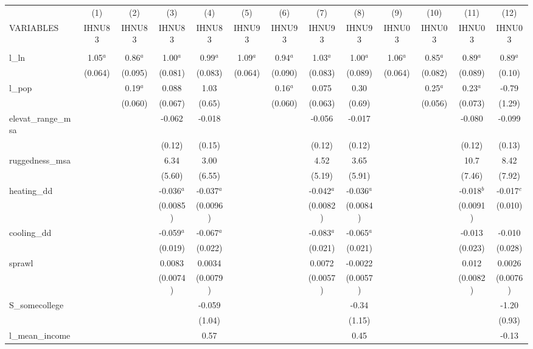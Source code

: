 \documentclass[]{article}
\begin{document}
\begin{tabular}{lcccccccccccc} \hline
 & (1) & (2) & (3) & (4) & (5) & (6) & (7) & (8) & (9) & (10) & (11) & (12) \\
VARIABLES & IHNU83 & IHNU83 & IHNU83 & IHNU83 & IHNU93 & IHNU93 & IHNU93 & IHNU93 & IHNU03 & IHNU03 & IHNU03 & IHNU03 \\ \hline
 &  &  &  &  &  &  &  &  &  &  &  &  \\
l\_ln & 1.05$^a$ & 0.86$^a$ & 1.00$^a$ & 0.99$^a$ & 1.09$^a$ & 0.94$^a$ & 1.03$^a$ & 1.00$^a$ & 1.06$^a$ & 0.85$^a$ & 0.89$^a$ & 0.89$^a$ \\
 & (0.064) & (0.095) & (0.081) & (0.083) & (0.064) & (0.090) & (0.083) & (0.089) & (0.064) & (0.082) & (0.089) & (0.10) \\
l\_pop &  & 0.19$^a$ & 0.088 & 1.03 &  & 0.16$^a$ & 0.075 & 0.30 &  & 0.25$^a$ & 0.23$^a$ & -0.79 \\
 &  & (0.060) & (0.067) & (0.65) &  & (0.060) & (0.063) & (0.69) &  & (0.056) & (0.073) & (1.29) \\
elevat\_range\_msa &  &  & -0.062 & -0.018 &  &  & -0.056 & -0.017 &  &  & -0.080 & -0.099 \\
 &  &  & (0.12) & (0.15) &  &  & (0.12) & (0.12) &  &  & (0.12) & (0.13) \\
ruggedness\_msa &  &  & 6.34 & 3.00 &  &  & 4.52 & 3.65 &  &  & 10.7 & 8.42 \\
 &  &  & (5.60) & (6.55) &  &  & (5.19) & (5.91) &  &  & (7.46) & (7.92) \\
heating\_dd &  &  & -0.036$^a$ & -0.037$^a$ &  &  & -0.042$^a$ & -0.036$^a$ &  &  & -0.018$^b$ & -0.017$^c$ \\
 &  &  & (0.0085) & (0.0096) &  &  & (0.0082) & (0.0084) &  &  & (0.0091) & (0.010) \\
cooling\_dd &  &  & -0.059$^a$ & -0.067$^a$ &  &  & -0.083$^a$ & -0.065$^a$ &  &  & -0.013 & -0.010 \\
 &  &  & (0.019) & (0.022) &  &  & (0.021) & (0.021) &  &  & (0.023) & (0.028) \\
sprawl &  &  & 0.0083 & 0.0034 &  &  & 0.0072 & -0.0022 &  &  & 0.012 & 0.0026 \\
 &  &  & (0.0074) & (0.0079) &  &  & (0.0057) & (0.0057) &  &  & (0.0082) & (0.0076) \\
S\_somecollege &  &  &  & -0.059 &  &  &  & -0.34 &  &  &  & -1.20 \\
 &  &  &  & (1.04) &  &  &  & (1.15) &  &  &  & (0.93) \\
l\_mean\_income &  &  &  & 0.57 &  &  &  & 0.45 &  &  &  & -0.13 \\

\end{tabular}
\end{document}
